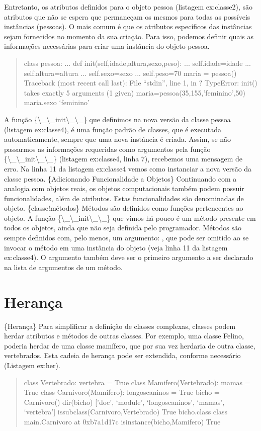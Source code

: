 \documentclass[a4paper,10pt,portuguese]{sphinxmanual}
\begin{document}
Entretanto, os atributos definidos para o objeto pessoa (listagem
ex:classe2), são atributos que não se espera que permaneçam os
mesmos para todas as possíveis instâncias (pessoas). O mais comum é
que os atributos específicos das instâncias sejam fornecidos no
momento da sua criação. Para isso, podemos definir quais as
informações necessárias para criar uma instância do objeto pessoa.
\begin{quote}

class pessoa: ... def init(self,idade,altura,sexo,peso): ...
self.idade=idade ... self.altura=altura ... self.sexo=sexo ...
self.peso=70 maria = pessoa() Traceback (most recent call last):
File ``stdin'', line 1, in ? TypeError: init() takes exactly 5
arguments (1 given) maria=pessoa(35,155,'feminino',50) maria.sexo
`feminino'
\end{quote}

A função \{\textbackslash{}\_\textbackslash{}\_init\textbackslash{}\_\textbackslash{}\_\} que definimos na nova versão da
classe pessoa (listagem ex:classe4), é uma função padrão de
classes, que é executada automaticamente, sempre que uma nova
instância é criada. Assim, se não passarmos as informações
requeridas como argumentos pela função \{\textbackslash{}\_\textbackslash{}\_init\textbackslash{}\_\textbackslash{}\_\}
(listagem ex:classe4, linha 7), recebemos uma mensagem de erro. Na
linha 11 da listagem ex:classe4 vemos como instanciar a nova versão
da classe pessoa. \{Adicionando Funcionalidade a Objetos\}
Continuando com a analogia com objetos reais, os objetos
computacionais também podem possuir funcionalidades, além de
atributos. Estas funcionalidades são denominadas  de
objeto. \{classe!métodos\} Métodos são definidos como funções
pertencentes ao objeto. A função \{\textbackslash{}\_\textbackslash{}\_init\textbackslash{}\_\textbackslash{}\_\} que vimos
há pouco é um método presente em todos os objetos, ainda que não
seja definida pelo programador. Métodos são sempre definidos com,
pelo menos, um argumento: , que pode ser omitido ao se
invocar o método em uma instância do objeto (veja linha 11 da
listagem ex:classe4). O argumento  também deve ser o
primeiro argumento a ser declarado na lista de argumentos de um
método.


\section{Herança}
\label{CapObj:heranca}
\{Herança\} Para simplificar a definição de classes complexas,
classes podem herdar atributos e métodos de outras classes. Por
exemplo, uma classe Felino, poderia herdar de uma classe mamífero,
que por sua vez herdaria de outra classe, vertebrados. Esta cadeia
de herança pode ser extendida, conforme necessário (Listagem
ex:her).
\begin{quote}

class Vertebrado: vertebra = True class Mamifero(Vertebrado): mamas
= True class Carnivoro(Mamifero): longoscaninos = True bicho =
Carnivoro() dir(bicho) {[}'doc', `module', `longoscaninos', `mamas',
`vertebra'{]} issubclass(Carnivoro,Vertebrado) True bicho.class class
main.Carnivoro at 0xb7a1d17c isinstance(bicho,Mamifero) True
\end{quote}
\end{document}
